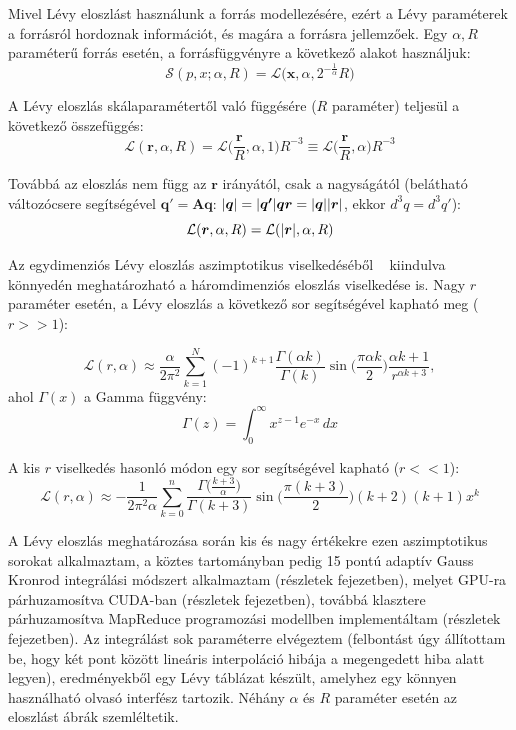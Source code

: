 \documentclass[10pt,a4paper]{article}
\numberwithin{equation}{subsection}
\numberwithin{figure}{section}
\begin{document}
Mivel Lévy eloszlást használunk a forrás modellezésére, ezért a Lévy paraméterek a forrásról hordoznak információt, és magára a forrásra jellemzőek. Egy $\alpha, R$ paraméterű forrás esetén, a forrásfüggvényre a következő alakot használjuk:
\begin{equation}
\mathcal{S}(p,x; \alpha, R) =\mathcal{L}\big(\bm{x}, \alpha, 2^{-\frac{1}{\alpha}}R\big)
\end{equation}

A Lévy eloszlás skálaparamétertől való függésére ($R$ paraméter) teljesül a következő összefüggés:
\begin{equation}
\mathcal{L}(\bm{r}, \alpha, R) = \mathcal{L}\bigg(\frac{\bm{r}}{R}, \alpha, 1\bigg)R^{-3}\equiv \mathcal{L}\bigg(\frac{\bm{r}}{R}, \alpha\bigg)R^{-3}
\end{equation}

Továbbá az eloszlás nem függ az $\bm{r}$ irányától, csak a nagyságától (belátható változócsere segítségével $\bm{q'}=\bm{Aq}$: $\abs{\bm{q}}=\abs{\bm{q'}}\bm{qr}=\abs{\bm{q}}\abs{\bm{r}}$, ekkor $d^3 q=d^3 q'$):
\begin{equation}
\mathcal{L}(\bm{r}, \alpha, R)=\mathcal{L}(\abs{\bm{r}}, \alpha, R)
\end{equation}

Az egydimenziós Lévy eloszlás aszimptotikus viselkedéséből  ~\cite{LevyEff} kiindulva könnyedén meghatározható a háromdimenziós eloszlás viselkedése is. Nagy $r$ paraméter esetén, a Lévy eloszlás a következő sor segítségével kapható meg ($r>>1$):

\begin{equation}
\mathcal{L}(r,\alpha) \approx \frac{\alpha}{2\pi^2}\sum_{k=1}^{N}(-1)^{k+1}\frac{\Gamma(\alpha k)}{\Gamma(k)} \sin{\bigg(\frac{\pi\alpha k}{2}\bigg)}\frac{\alpha k+1}{r^{\alpha k+3}},
\end{equation}
ahol $\Gamma(x)$ a Gamma függvény:
\begin{equation}
 \Gamma (z)=\int _{0}^{\infty }x^{z-1}e^{-x}\,dx
 \label{eq:gamma}
\end{equation}

A kis $r$ viselkedés hasonló módon egy sor segítségével kapható ($r<<1$):
\begin{equation}
\mathcal{L}(r,\alpha) \approx -\frac{1}{2\pi^2\alpha}\sum_{k=0}^n\frac{\Gamma\big(\frac{k+3}{\alpha}\big)}{\Gamma(k+3)}\sin{\bigg(\frac{\pi(k+3)}{2}\bigg)}(k+2)(k+1)x^k
\end{equation} 

A Lévy eloszlás meghatározása során kis és nagy értékekre ezen aszimptotikus sorokat alkalmaztam, a köztes tartományban pedig 15 pontú adaptív Gauss Kronrod integrálási módszert alkalmaztam (részletek  fejezetben), melyet GPU-ra párhuzamosítva CUDA-ban (részletek  fejezetben), továbbá klasztere párhuzamosítva MapReduce programozási modellben implementáltam (részletek  fejezetben). Az integrálást sok paraméterre elvégeztem (felbontást úgy állítottam be, hogy két pont között lineáris interpoláció hibája a megengedett hiba alatt legyen), eredményekből egy Lévy táblázat készült, amelyhez egy könnyen használható olvasó interfész tartozik. Néhány $\alpha$ és $R$ paraméter esetén az eloszlást  ábrák szemléltetik.
\end{document}
